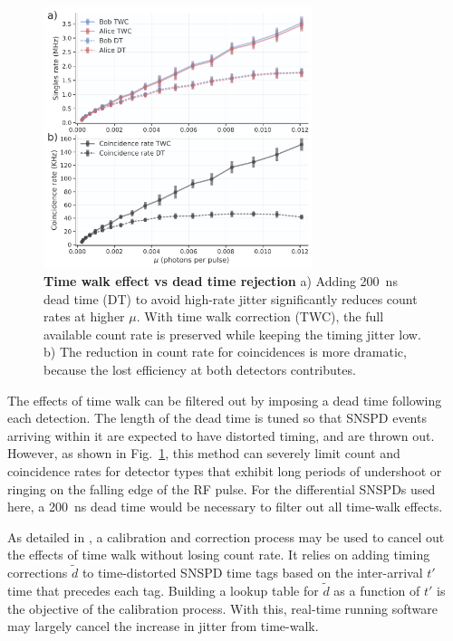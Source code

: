 \documentclass[11pt]{caltech_thesis} %
\begin{document}
\hypertarget{fig:time_walk_vs_dead_time}{%
\begin{figure}
\centering
\includegraphics[width=0.7\textwidth,height=\textheight]{./chapter_05/figs/time_walk_comparison_light.pdf}
\caption[{sTime walk effect vs dead time rejection}]{\textbf{Time walk effect vs dead time rejection} a) Adding 200~ns dead time (DT) to avoid high-rate jitter significantly reduces count rates at higher $\mu$. With time walk correction (TWC), the full available count rate is preserved while keeping the timing jitter low. b) The reduction in count rate for coincidences is more dramatic, because the lost efficiency at both detectors contributes.}
\label{fig:time_walk_vs_dead_time}
\end{figure}
}

The effects of time walk can be filtered out by imposing a dead time following each detection. The length of the dead time is tuned so that SNSPD events arriving within it are expected to have distorted timing, and are thrown out. However, as shown in Fig.~\ref{fig:time_walk_vs_dead_time}, this method can severely limit count and coincidence rates for detector types that exhibit long periods of undershoot or ringing on the falling edge of the RF pulse. For the differential SNSPDs used here, a 200~ns dead time would be necessary to filter out all time-walk effects.

As detailed in \autocite{Mueller2023,Craiciu23}, a calibration and correction process may be used to cancel out the effects of time walk without losing count rate. It relies on adding timing corrections $\tilde{d}$ to time-distorted SNSPD time tags based on the inter-arrival $t'$ time that precedes each tag. Building a lookup table for $\tilde{d}$ as a function of $t'$ is the objective of the calibration process. With this, real-time running software may largely cancel the increase in jitter from time-walk.
\end{document}
